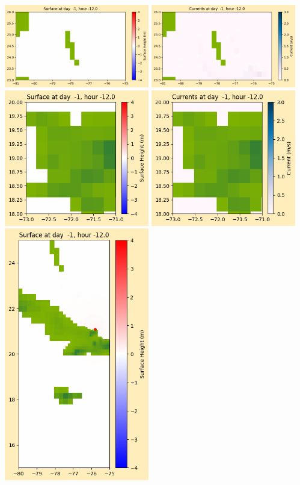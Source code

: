 \documentclass[11pt]{article}
\begin{document}
\vskip 10pt 
\includegraphics[width=0.475\textwidth]{frame0006fig1003.png}
\includegraphics[width=0.475\textwidth]{frame0006fig1004.png}
\vskip 10pt 
\includegraphics[width=0.475\textwidth]{frame0006fig1005.png}
\includegraphics[width=0.475\textwidth]{frame0006fig1006.png}
\vskip 10pt 
\includegraphics[width=0.475\textwidth]{frame0006fig1007.png}
\end{document}
